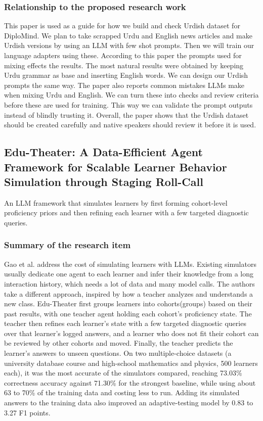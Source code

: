 \documentclass{FastFyp}
\begin{document}
\subsubsection{Relationship to the proposed research work}
This paper is used as a guide for how we build and check Urdish dataset for DiploMind. We plan to take scrapped Urdu and English news articles and make Urdish versions by using an LLM with few shot prompts. Then we will train our language adapters using these. According to this paper the prompts used for mixing effects the results. The most natural results were obtained by keeping Urdu grammar as base and inserting English words. We can design our Urdish prompts the same way. The paper also reports common mistakes LLMs make when mixing Urdu and English. We can turn these into checks and review criteria before these are used for training. This way we can validate the prompt outputs instead of blindly trusting it. Overall, the paper shows that the Urdish dataset should be created carefully and native speakers should review it before it is used.


\subsection{Edu-Theater: A Data-Efficient Agent Framework for Scalable Learner Behavior Simulation through Staging Roll-Call}
An LLM framework that simulates learners by first forming cohort-level proficiency priors and then refining each learner with a few targeted diagnostic queries.

\subsubsection{Summary of the research item}
Gao et al. \cite{gao2026edutheater} address the cost of simulating learners with LLMs. Existing simulators usually dedicate one agent to each learner and infer their knowledge from a long interaction history, which needs a lot of data and many model calls. The authors take a different approach, inspired by how a teacher analyzes and understands a new class. Edu-Theater first groups learners into cohorts(groups) based on their past results, with one teacher agent holding each cohort's proficiency state. The teacher then refines each learner's state with a few targeted diagnostic queries over that learner's logged answers, and a learner who does not fit their cohort can be reviewed by other cohorts and moved. Finally, the teacher predicts the learner's answers to unseen questions. On two multiple-choice datasets (a university database course and high-school mathematics and physics, 500 learners each), it was the most accurate of the simulators compared, reaching 73.03\% correctness accuracy against 71.30\% for the strongest baseline, while using about 63 to 70\% of the training data and costing less to run. Adding its simulated answers to the training data also improved an adaptive-testing model by 0.83 to 3.27 F1 points.
\end{document}
